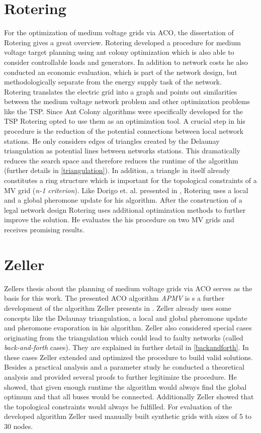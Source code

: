 \section{Rotering}
For the optimization of medium voltage grids via ACO, the dissertation of Rotering \cite{rotering2013zielnetzplanung} gives a great overview.
Rotering developed a procedure for medium voltage target planning using ant colony optimization which is also able to consider controllable loads and generators. In addition to network costs he also conducted an economic evaluation, which is part of the network design, but methodologically separate from the energy supply task of the network.\\
Rotering translates the electric grid into a graph and points out similarities between the medium voltage network problem and other optimization problems like the TSP. Since Ant Colony algorithms were specifically developed for the TSP Rotering opted to use them as an optimization tool. A crucial step in his procedure is the reduction of the potential connections between local network stations. He only considers edges of triangles created by the Delaunay triangulation as potential lines between networks stations. This dramatically reduces the search space and therefore reduces the runtime of the algorithm (further details in \ref{triangulation}). In addition, a triangle in itself already constitutes a ring structure which is important for the topological constraints of a MV grid (\textit{n-1 criterion}). Like Dorigo et. al. presented in \cite{ant_coloy_system}, Rotering uses a local and a global pheromone update for his algorithm. After the construction of a legal network design Rotering uses additional optimization methods to further improve the solution. He evaluates the his procedure on two MV grids and receives promising results.



\section{Zeller}
Zellers thesis about the planning of medium voltage grids via ACO serves as the basis for this work. The presented ACO algorithm \textit{APMV} is s a further development of the algorithm Zeller presents in \cite{zeller2021planung}. Zeller already uses some concepts like the Delaunay triangulation, a local and global pheromone update and pheromone evaporation in his algorithm. Zeller also considered special cases originating from the triangulation which could lead to faulty networks (called \textit{back-and-forth} cases). They are explained in further detail in \ref{backandforth}. In these cases Zeller extended and optimized the procedure to build valid solutions. Besides a practical analysis and a parameter study he conducted a theoretical analysis and provided several proofs to further legitimize the procedure. He showed, that given enough runtime the algorithm would always find the global optimum and that all buses would be connected. Additionally Zeller showed that the topological constraints would always be fulfilled. For evaluation of the developed algorithm Zeller used manually built synthetic grids with sizes of 5 to 30 nodes.


